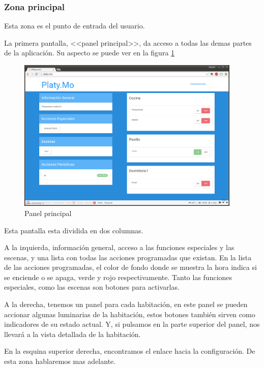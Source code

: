     \subsubsection{Zona principal}
    
    Esta zona es el punto de entrada del usuario. 
    
    La primera pantalla, <<panel principal>>, da acceso a todas las demas partes de la aplicación. Su aspecto se puede ver en la figura \ref{fig:panel_ppal}
    
    \begin{figure}[htbp]
        \centering
        \includegraphics[width=0.95\textwidth]{imagenes/panel_ppal.png}
        \caption{Panel principal}
        \label{fig:panel_ppal}
    \end{figure}
    
    Esta pantalla esta dividida en dos columnas.
    
     A la izquierda, información general, acceso a las funciones especiales y las escenas, y una lista con todas las acciones programadas que existan. En la lista de las acciones programadas, el color de fondo donde se muestra la hora indica si se enciende o se apaga, verde y rojo respectivamente. Tanto las funciones especiales, como las escenas son botones para activarlas.
     
     A la derecha, tenemos un panel para cada habitación, en este panel se pueden accionar algunas luminarias de la habitación, estos botones también sirven como indicadores de su estado actual. Y, si pulsamos en la parte superior del panel, nos llevará a la vista detallada de la habitación. 
    
    En la esquina superior derecha, encontramos el enlace hacia la configuración. De esta zona hablaremos mas adelante.
    

